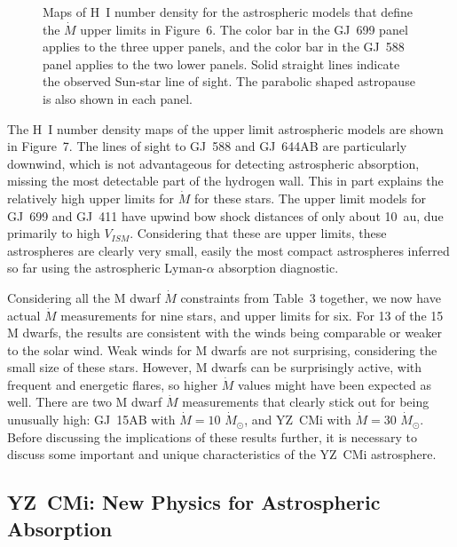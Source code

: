 \documentclass[preprint]{aastex}
\begin{document}
\begin{figure}[t]
\caption{Maps of H~I number density for the astrospheric models that
  define the $\dot{M}$ upper limits in Figure~6.  The color bar in the
  GJ~699 panel applies to the three upper panels, and the color bar
  in the GJ~588 panel applies to the two lower panels.  Solid straight lines
  indicate the observed Sun-star line of sight.  The parabolic shaped
  astropause is also shown in each panel.}
\end{figure}
     The H~I number density maps of the upper limit astrospheric
models are shown in Figure~7.  The lines of sight to GJ~588 and GJ~644AB
are particularly downwind, which is not advantageous for detecting
astrospheric absorption, missing the most detectable part of
the hydrogen wall.  This in part explains the relatively high
upper limits for $\dot{M}$ for these stars.  The upper limit models for
GJ~699 and GJ~411 have upwind bow shock distances of only about 10~au,
due primarily to high $V_{ISM}$.  Considering that these
are upper limits, these astrospheres are clearly very small,
easily the most compact astrospheres inferred so far using
the astrospheric Lyman-$\alpha$ absorption diagnostic.

     Considering all the M dwarf $\dot{M}$ constraints from
Table~3 together, we now have actual $\dot{M}$ measurements
for nine stars, and upper limits for six.
For 13 of the 15 M dwarfs, the results are
consistent with the winds being comparable or weaker to
the solar wind.
Weak winds for M dwarfs are not surprising,
considering the small size of these stars.  However,
M dwarfs can be surprisingly active, with frequent and energetic
flares, so higher $\dot{M}$ values might have been
expected as well.  There are two M dwarf $\dot{M}$
measurements that clearly stick out for being unusually
high:  GJ~15AB with $\dot{M}=10$ $\dot{M}_{\odot}$, and
YZ~CMi with $\dot{M}=30$ $\dot{M}_{\odot}$.  Before discussing
the implications of these results further, it is necessary
to discuss some important and unique characteristics of
the YZ~CMi astrosphere.

\subsection{YZ~CMi: New Physics for Astrospheric Absorption}
\end{document}
